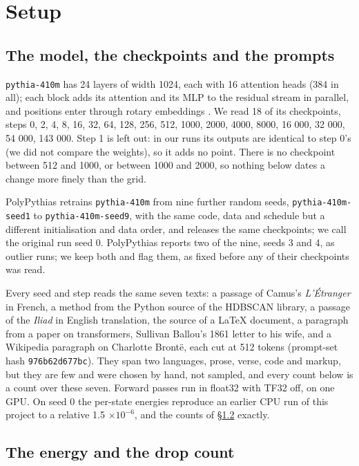 \documentclass[11pt]{article}
\begin{document}
\section{Setup}\label{sec:3}

\subsection{The model, the checkpoints and the prompts}\label{sec:3.1}

\texttt{pythia-410m} has 24 layers of width 1024, each with 16 attention heads (384 in all); each block adds its attention and its MLP to the residual stream in parallel, and positions enter through rotary embeddings \citep{biderman2023}. We read 18 of its checkpoints, steps 0, 2, 4, 8, 16, 32, 64, 128, 256, 512, 1000, 2000, 4000, 8000, 16 000, 32 000, 54 000, 143 000. Step 1 is left out: in our runs its outputs are identical to step 0's (we did not compare the weights), so it adds no point. There is no checkpoint between 512 and 1000, or between 1000 and 2000, so nothing below dates a change more finely than the grid.

PolyPythias \citep{vanderwal2025} retrains \texttt{pythia-410m} from nine further random seeds, \texttt{pythia-410m-seed1} to \texttt{pythia-410m-seed9}, with the same code, data and schedule but a different initialisation and data order, and releases the same checkpoints; we call the original run seed 0. PolyPythias reports two of the nine, seeds 3 and 4, as outlier runs; we keep both and flag them, as fixed before any of their checkpoints was read.

Every seed and step reads the same seven texts: a passage of Camus's \emph{L'Étranger} in French, a method from the Python source of the HDBSCAN library, a passage of the \emph{Iliad} in English translation, the source of a LaTeX document, a paragraph from a paper on transformers, Sullivan Ballou's 1861 letter to his wife, and a Wikipedia paragraph on Charlotte Brontë, each cut at 512 tokens (prompt-set hash \texttt{976b62d677bc}). They span two languages, prose, verse, code and markup, but they are few and were chosen by hand, not sampled, and every count below is a count over these seven. Forward passes run in float32 with TF32 off, on one GPU. On seed 0 the per-state energies reproduce an earlier CPU run of this project to a relative 1.5 $\times 10^{-6}$, and the counts of \S\ref{sec:3.2} exactly.

\subsection{The energy and the drop count}\label{sec:3.2}
\end{document}
